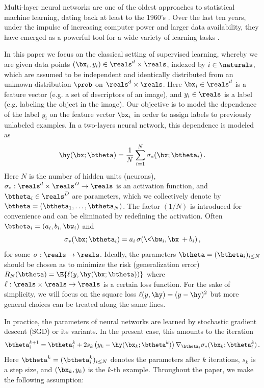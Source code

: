 \documentclass[11pt]{article}
\begin{document}
Multi-layer neural networks are one of the oldest approaches to statistical machine learning, dating back
at least to the 1960's \cite{rosenblatt1962principles}. Over the last ten years, under the impulse of increasing computer power and 
larger data availability,  they have emerged as a powerful tool for a wide variety of learning tasks \cite{krizhevsky2012imagenet,goodfellow2016deep}.

In this paper we focus on the classical setting of supervised learning, whereby we are given data
points $(\bx_i,y_i)\in\reals^d\times \reals$, indexed by $i\in\naturals$, which are assumed to be independent and identically
distributed from an unknown distribution $\prob$ on $\reals^d\times \reals$. Here $\bx_i\in\reals^d$ is a feature vector
(e.g. a set of descriptors of an image), and $y_i\in\reals$ is a label (e.g. labeling the object in the image).
Our objective is to model the dependence of the label $y_i$ on the feature vector $\bx_i$ in order to assign labels to previously 
unlabeled examples.
In a two-layers neural network, this dependence is modeled as 
%
\begin{equation}
%
\hy(\bx;\btheta) = \frac{1}{N}\sum_{i=1}^{N}\sigma_*(\bx;\btheta_i)\, .
%
\end{equation}
%
Here $N$ is the number of hidden units (neurons),  $\sigma_*:\reals^d\times\reals^D\to\reals$ is
an activation function, and  $\btheta_i\in \reals^D$ are parameters, which we collectively denote by $\btheta=(\btheta_1,\dots,\btheta_N)$.
The factor $(1/N)$ is introduced for convenience and can be eliminated by redefining the activation.
Often $\btheta_i=(a_i,b_i,\bw_i)$ 
and
%
\begin{equation}
%
\sigma_*(\bx;\btheta_i) = a_i\, \sigma(\<\bw_i,\bx\>+b_i)\, ,\label{eq:OutputShift}
%
\end{equation}
%
for some $\sigma:\reals\to\reals$.
Ideally, the parameters $\btheta=(\btheta_i)_{i\le N}$ should be chosen as to minimize the risk (generalization error) 
$R_{N}(\btheta) =\E \{\ell(y,\hy(\bx;\btheta))\}$ where $\ell:\reals\times\reals\to\reals$ is a certain loss function.
For the sake of simplicity, we will focus on the square loss $\ell(y,\hy) = (y-\hy)^2$ but more general choices can be treated along the same lines.

In practice, the parameters of neural networks are learned by stochastic gradient descent \cite{robbins1951stochastic} (SGD) or its variants. 
In the present case, this amounts to the iteration 
%
\begin{equation}
%
\btheta_i^{k+1} = \btheta_i^{k} + 2s_k\,\big(y_k-\hy(\bx_k;\btheta^k)\big)\, \nabla_{\btheta_i}\sigma_*(\bx_k;\btheta^k_i)\, . \label{eq:First_SGD}
%
\end{equation}
%
Here $\btheta^k=(\btheta^k_i)_{i\le N}$ denotes the parameters after $k$ iterations, $s_k$ is a step size, and $(\bx_k,y_k)$ is the $k$-th example.
Throughout the paper, we make the following assumption:
\end{document}
